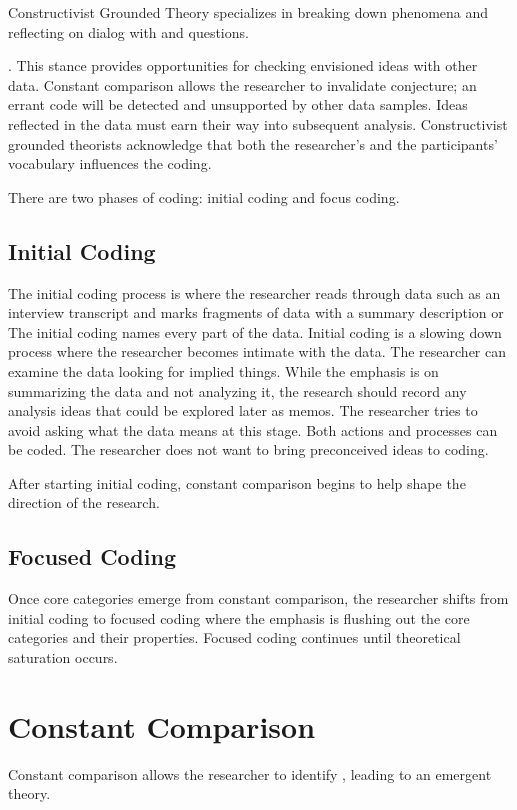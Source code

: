 Constructivist Grounded Theory specializes in breaking down phenomena and reflecting on dialog with  and  questions.

 \cite{Charmaz}. This stance provides opportunities for checking envisioned ideas with other data. Constant comparison allows the researcher to invalidate conjecture; an errant code will be detected and unsupported by other data samples. Ideas reflected in the data must earn their way into subsequent analysis. Constructivist grounded theorists acknowledge that both the researcher's and the participants' vocabulary influences the coding.

There are two phases of coding: initial coding and focus coding. 

\subsection{Initial Coding}
The initial coding process is where the researcher reads through data such as an interview transcript and marks fragments of data with a summary description or  The initial coding names every part of the data.  Initial coding is a slowing down process where the researcher becomes intimate with the data. The researcher can examine the data looking for implied things. While the emphasis is on summarizing the data and not analyzing it, the research should record any analysis ideas that could be explored later as memos. The researcher tries to avoid asking what the data means at this stage. Both actions and processes can be coded. The researcher does not want to bring preconceived ideas to coding.

After starting initial coding, constant comparison begins to help shape the direction of the research. 
\subsection{Focused Coding}
Once core categories emerge from constant comparison, the researcher shifts from initial coding to focused coding where the emphasis is flushing out the core categories and their properties. Focused coding continues until theoretical saturation occurs.

\section{Constant Comparison}
Constant comparison allows the researcher to identify  \cite{GlaserBasics}, leading to an emergent theory.

